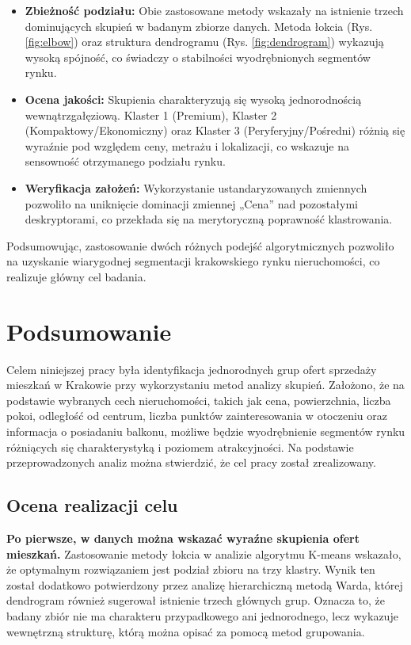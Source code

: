 \documentclass{report}
\begin{document}
\begin{itemize}
    \item \textbf{Zbieżność podziału:} Obie zastosowane metody wskazały na istnienie trzech dominujących skupień w badanym zbiorze danych. Metoda łokcia (Rys. \ref{fig:elbow}) oraz struktura dendrogramu (Rys. \ref{fig:dendrogram}) wykazują wysoką spójność, co świadczy o stabilności wyodrębnionych segmentów rynku.
    \item \textbf{Ocena jakości:} Skupienia charakteryzują się wysoką jednorodnością wewnątrzgałęziową. Klaster 1 (Premium), Klaster 2 (Kompaktowy/Ekonomiczny) oraz Klaster 3 (Peryferyjny/Pośredni) różnią się wyraźnie pod względem ceny, metrażu i lokalizacji, co wskazuje na sensowność otrzymanego podziału rynku.
    \item \textbf{Weryfikacja założeń:} Wykorzystanie ustandaryzowanych zmiennych pozwoliło na uniknięcie dominacji zmiennej „Cena” nad pozostałymi deskryptorami, co przekłada się na merytoryczną poprawność klastrowania.
\end{itemize}

Podsumowując, zastosowanie dwóch różnych podejść algorytmicznych pozwoliło na uzyskanie wiarygodnej segmentacji krakowskiego rynku nieruchomości, co realizuje główny cel badania.

\chapter{Podsumowanie}



Celem niniejszej pracy była identyfikacja jednorodnych grup ofert sprzedaży mieszkań w Krakowie przy wykorzystaniu metod analizy skupień. Założono, że na podstawie wybranych cech nieruchomości, takich jak cena, powierzchnia, liczba pokoi, odległość od centrum, liczba punktów zainteresowania w otoczeniu oraz informacja o posiadaniu balkonu, możliwe będzie wyodrębnienie segmentów rynku różniących się charakterystyką i poziomem atrakcyjności. Na podstawie przeprowadzonych analiz można stwierdzić, że cel pracy został zrealizowany.

\section{Ocena realizacji celu}

\textbf{Po pierwsze, w danych można wskazać wyraźne skupienia ofert mieszkań.} Zastosowanie metody łokcia w analizie algorytmu K-means wskazało, że optymalnym rozwiązaniem jest podział zbioru na trzy klastry. Wynik ten został dodatkowo potwierdzony przez analizę hierarchiczną metodą Warda, której dendrogram również sugerował istnienie trzech głównych grup. Oznacza to, że badany zbiór nie ma charakteru przypadkowego ani jednorodnego, lecz wykazuje wewnętrzną strukturę, którą można opisać za pomocą metod grupowania.
\end{document}
